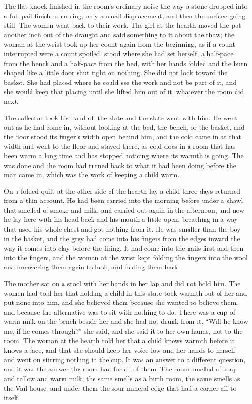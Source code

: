 The flat knock finished in the room's ordinary noise the way a stone dropped into a full pail finishes: no ring, only a small displacement, and then the surface going still. The women went back to their work. The girl at the hearth moved the pot another inch out of the draught and said something to it about the thaw; the woman at the wrist took up her count again from the beginning, as if a count interrupted were a count spoiled.  stood where she had set herself, a half-pace from the bench and a half-pace from the bed, with her hands folded and the burn shaped like a little door shut tight on nothing. She did not look toward the basket. She had placed  where he could see the work and not be part of it, and she would keep that placing until she lifted him out of it, whatever the room did next.

The collector took his hand off the slate and the slate went with him. He went out as he had come in, without looking at the bed, the bench, or the basket, and the door stood its finger's width open behind him, and the cold came in at that width and went to the floor and stayed there, as cold does in a room that has been warm a long time and has stopped noticing where its warmth is going. The  was done and the room had turned back to what it had been doing before the man came in, which was the work of keeping a child warm.

On a folded quilt at the other side of the hearth lay a child three days returned from a thin account. He had been carried into  the morning before under a shawl that smelled of smoke and milk, and carried out again in the afternoon, and now he lay here with his head back and his mouth a little open, breathing in a way that used his whole chest and got nothing from it. He was smaller than the boy in the basket, and the grey had come into his fingers from the edges inward the way it comes into clay before the firing. It had come into the nails first and then into the fingers, and the woman at the wrist kept folding the fingers into the wool and uncovering them again to look, and folding them back.

The mother sat on a stool with her hands in her lap and did not hold him. The women had told her that holding a child in this state took warmth out of her and put none into him, and she believed them because she wanted to believe them, and because the alternative was to sit with nothing to do. There was a cup of warm milk on the bench beside her and she had not drunk from it. “Will he know me, if he comes through?” she said, and she said it to her own hands, not to the room. The woman at the hearth told her that a child knows warmth before it knows a face, and that she should keep her voice low and her hands to herself, and went on stirring nothing in the cup. It was an answer to a different question, and it was the answer the room had for all of them. The room smelled of soap and tallow and warm milk, the same smells as a birth room, the same smells as the Vail house, and under them the sour mineral edge that had a corner all to itself.


